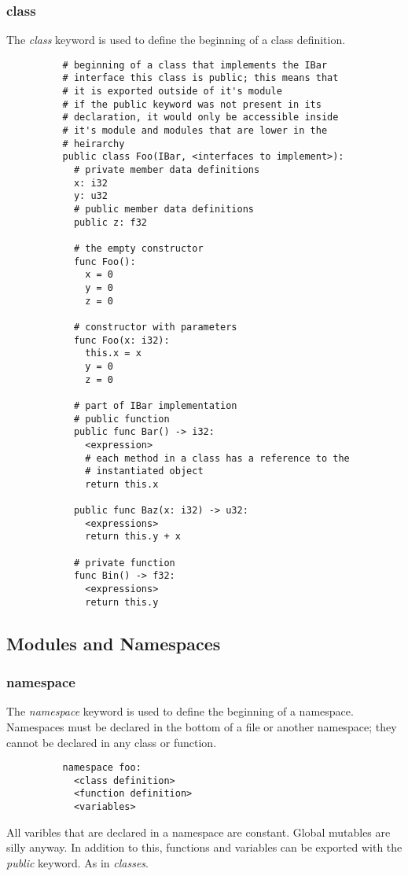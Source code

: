 \documentclass{article}
\newcommand{\subcentersec}[1]{\subsection*{\hfil #1 \hfil}}
\begin{document}
      \subsubsection*{class}
        The \textit{class} keyword is used to define the beginning of a class
        definition.
        \begin{verbatim}
          # beginning of a class that implements the IBar
          # interface this class is public; this means that
          # it is exported outside of it's module
          # if the public keyword was not present in its
          # declaration, it would only be accessible inside
          # it's module and modules that are lower in the
          # heirarchy
          public class Foo(IBar, <interfaces to implement>):
            # private member data definitions
            x: i32
            y: u32
            # public member data definitions
            public z: f32

            # the empty constructor
            func Foo():
              x = 0
              y = 0
              z = 0

            # constructor with parameters
            func Foo(x: i32):
              this.x = x
              y = 0
              z = 0

            # part of IBar implementation
            # public function
            public func Bar() -> i32:
              <expression>
              # each method in a class has a reference to the
              # instantiated object
              return this.x

            public func Baz(x: i32) -> u32:
              <expressions>
              return this.y + x

            # private function
            func Bin() -> f32:
              <expressions>
              return this.y
        \end{verbatim}


    \subcentersec{Modules and Namespaces}
      \subsubsection*{namespace}
        The \textit{namespace} keyword is used to define the beginning of a namespace.
        Namespaces must be declared in the bottom of a file or another namespace; they
        cannot be declared in any class or function.
        \begin{verbatim}
          namespace foo:
            <class definition>
            <function definition>
            <variables>
        \end{verbatim}
        All varibles that are declared in a namespace are constant. Global mutables
        are silly anyway.
        In addition to this, functions and variables can be exported with the
        \textit{public} keyword. As in \textit{classes}.
\end{document}
